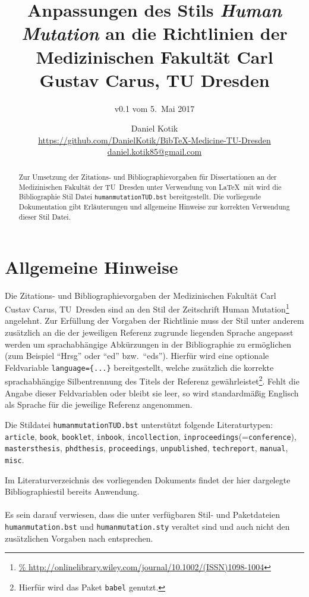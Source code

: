 \documentclass[a4paper,10pt]{scrartcl}
\title{Anpassungen des Stils \emph{Human Mutation} an die
Richtlinien der Medizinischen Fakultät Carl Gustav Carus, TU Dresden}
\subtitle{v0.1 vom 5.~Mai 2017}
\author{Daniel Kotik\\
\large\url{https://github.com/DanielKotik/BibTeX-Medicine-TU-Dresden}\\
\large\url{daniel.kotik85@gmail.com}}
\date{}
\renewcommand{\cite}{\citep}  %
\begin{document}
\setlength{\parindent}{0em}
\maketitle

\begin{abstract}
Zur Umsetzung der Zitations- und Bibliographievorgaben für Dissertationen an
der Medizinischen Fakultät der TU~Dresden unter Verwendung von \LaTeX\ mit
 wird die Bibliographie Stil Datei
\verb|humanmutationTUD.bst| bereitgestellt. Die vorliegende Dokumentation gibt
Erläuterungen und allgemeine Hinweise zur korrekten Verwendung dieser Stil
Datei.
\end{abstract}

\section{Allgemeine Hinweise}
Die Zitations- und Bibliographievorgaben \cite{ZitiervorgabenCGC} der
Medizinischen Fakultät Carl Custav
Carus, TU~Dresden sind an den Stil der Zeitschrift Human
Mutation\footnote{\url{%
http://onlinelibrary.wiley.com/journal/10.1002/(ISSN)1098-1004}} angelehnt.
Zur Erfüllung der Vorgaben der Richtlinie muss der Stil unter anderem zusätzlich
an die der jeweiligen Referenz zugrunde liegenden Sprache angepasst werden um
sprachabhängige Abkürzungen in der Bibliographie zu ermöglichen (zum Beispiel
"`Hrsg"' oder "`ed"' bzw.\ "`eds"').
Hierfür wird eine optionale Feldvariable \verb|language={...}|
bereitgestellt, welche zusätzlich die korrekte sprachabhängige Silbentrennung
des Titels der Referenz gewährleistet\footnote{Hierfür wird das Paket
\verb|babel| genutzt.}. Fehlt die Angabe dieser Feldvariablen oder bleibt sie
leer, so wird standardmä{\ss}ig Englisch als Sprache für die jeweilige Referenz
angenommen.

Die Stildatei \verb|humanmutationTUD.bst| unterstützt folgende Literaturtypen:
\verb|article|, \verb|book|, \verb|booklet|, \verb|inbook|,
\verb|incollection|, \verb|inproceedings|(=\verb|conference|),
\verb|mastersthesis|, \verb|phdthesis|, \verb|proceedings|, \verb|unpublished|,
\verb|techreport|, \verb|manual|, \verb|misc|.


Im Literaturverzeichnis des vorliegenden
Dokuments findet der hier
dargelegte Bibliographiestil bereits Anwendung. \\\\
Es sein darauf verwiesen, dass die unter \cite{humanmutationSchneider}
verfügbaren Stil- und Paketdateien \verb|humanmutation.bst| und
\verb|humanmutation.sty| veraltet sind und auch nicht den zusätzlichen Vorgaben
nach \cite{ZitiervorgabenCGC} entsprechen.
\end{document}
